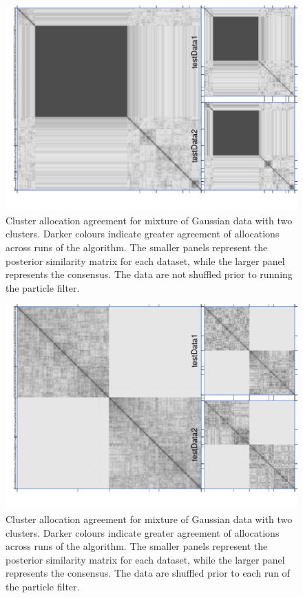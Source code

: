 \documentclass[10pt,a4paper]{article}
\begin{document}
  


\begin{figure}[H]
\label{fig:noshuffle}
\includegraphics[width = \linewidth]{plots/noshuffle.pdf}
\caption{Cluster allocation agreement for mixture of Gaussian data with two clusters. Darker colours indicate greater agreement of allocations across runs of the algorithm. The smaller panels represent the posterior similarity matrix for each dataset, while the larger panel represents the consensus. The data are not shuffled prior to running the particle filter.}
\end{figure}

\begin{figure}[H]
\label{fig:shuffle}
\includegraphics[width = \linewidth]{plots/shuffle.pdf}
\caption{Cluster allocation agreement for mixture of Gaussian data with two clusters. Darker colours indicate greater agreement of allocations across runs of the algorithm. The smaller panels represent the posterior similarity matrix for each dataset, while the larger panel represents the consensus. The data are shuffled prior to each run of the particle filter.}
\end{figure}
\end{document}
